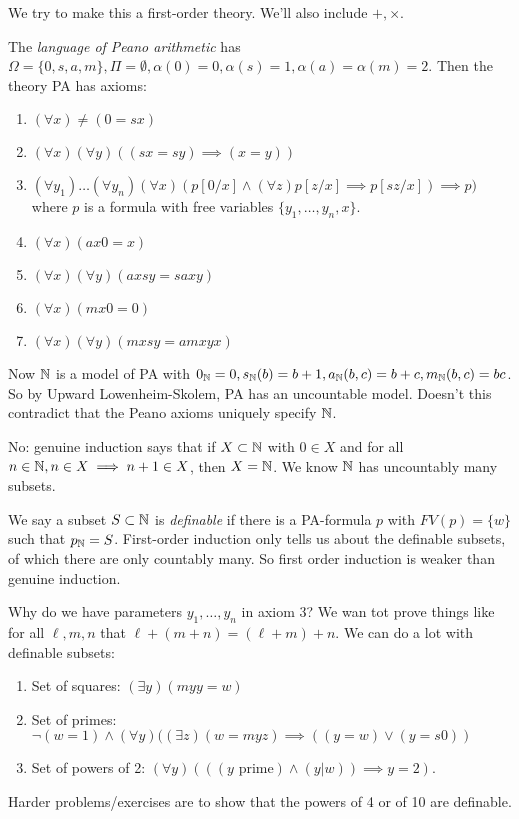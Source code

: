 \documentclass[10pt,a4paper]{article}
\begin{document}
We try to make this a first-order theory. We'll also include $+, \times$.

The \emph{language of Peano arithmetic} has $\Omega = \{0,s,a,m\}, \Pi = \emptyset, \alpha(0)=0, \alpha(s) = 1, \alpha(a)=\alpha(m) = 2$. Then the theory PA has axioms:
\begin{enumerate}
\item $(\forall x) \neq (0 = sx)$
\item $(\forall x)(\forall y)((sx=sy) \implies (x=y))$
\item $(\forall y_1)\ldots(\forall y_n)(\forall x)(p[0/x] \wedge (\forall z)p[z/x]\implies p[sz/x]) \implies p)$ where $p$ is a formula with free variables $\{y_1, \ldots, y_n, x\}$.
\item $(\forall x)(ax0 = x)$
\item $(\forall x)(\forall y)(axsy = saxy)$
\item $(\forall x)(mx0 = 0)$
\item $(\forall x)(\forall y)(mxsy = amxyx)$
\end{enumerate}
Now $\mathbb{N}$ is a model of PA with $0_{\mathbb{N}} = 0, s_{\mathbb{N}}(b) = b+1, a_{\mathbb{N}}(b,c) = b+c, m_{\mathbb{N}}(b,c) = bc$. So by Upward Lowenheim-Skolem, PA has an uncountable model. Doesn't this contradict that the Peano axioms uniquely specify $\mathbb{N}$.

No: genuine induction says that if $X \subset \mathbb{N}$ with $0 \in X$ and for all $n \in \mathbb{N}, n \in X \implies n+1 \in X$, then $X = \mathbb{N}$. We know $\mathbb{N}$ has uncountably many subsets.

We say a subset $S \subset \mathbb{N}$ is \emph{definable} if there is a PA-formula $p$ with $FV(p) = \{w\}$ such that $p_{\mathbb{N}} = S$. First-order induction only tells us about the definable subsets, of which there are only countably many. So first order induction is weaker than genuine induction.

Why do we have parameters $y_1, \ldots, y_n$ in axiom 3? We wan tot prove things like for all $\ell, m, n$ that $\ell + (m+n) = (\ell + m) + n$. We can do a lot with definable subsets:\\
\begin{enumerate}
\item Set of squares: $(\exists y)(myy = w)$
\item Set of primes: $\neg(w=1) \wedge (\forall y)((\exists z)(w=myz) \implies ((y=w)\vee (y=s0))$
\item Set of powers of 2: $(\forall y)(((y\text{ prime})\wedge(y|w)) \implies y = 2)$.
\end{enumerate}
Harder problems/exercises are to show that the powers of 4 or of 10 are definable.
\end{document}
